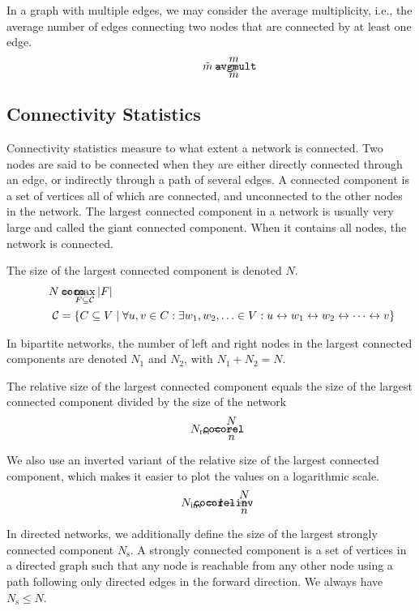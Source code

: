 \documentclass{article}
\def\mathnote#1{%
  \tag*{\rlap{\hspace\marginparsep\smash{\parbox[t]{\marginparwidth}{#1}}}}
}
\begin{document}
In a graph with multiple edges, we may consider the average
multiplicity, i.e., the average number of edges connecting two nodes
that are connected by at least one edge. 
\begin{align}
  \mathnote{\texttt{avgmult}}
  \tilde{m} = \frac m {\bar{\bar m}} 
\end{align}

\subsection{Connectivity Statistics}
Connectivity statistics measure to what extent a network is
connected. 
Two nodes are said to be connected when they are either directly
connected through an edge, or indirectly through a path of several
edges. 
A connected component is a set of vertices all of which are connected,
and unconnected to the other nodes in the network.  
The largest connected component in a network is usually very large and
called the giant connected component. When it contains all nodes, the
network is connected. 

The size of the largest connected component is denoted 
$N$.  
\begin{align}
  \mathnote{\texttt{coco}}
  N &= \max_{F \subseteq \mathcal C} |F|  \\
  \mathcal C &= \{ C \subseteq V \mid \forall u, v \in C:  \exists w_1,
  w_2, \ldots \in V:  u \leftrightarrow w_1 \leftrightarrow w_2 \leftrightarrow \cdots \leftrightarrow v \} \nonumber
\end{align}

In bipartite networks, the number of left and right nodes in the largest
connected components are denoted $N_1$ and $N_2$,
with $N_1 + N_2 = N$. 

The relative size of the largest connected component equals the
size of the largest connected component divided by the size of the
network
\begin{align}
  \mathnote{\texttt{cocorel}}
  N_{\mathrm{rel}} &= \frac N n. 
\end{align}

We also use an inverted variant of the relative size of the largest
connected component, which makes it easier to plot the values on a
logarithmic scale.
\begin{align}
  \mathnote{\texttt{cocorelinv}}
  N_{\mathrm{inv}} &= 1 - \frac N n 
\end{align}

In directed networks, we additionally define the size of the largest
strongly connected component $N_{\mathrm s}$.  A strongly
connected component is a 
set of vertices in a directed graph such that any node is reachable from
any other node using a path following only directed edges in the forward
direction.   We always have $N_{\mathrm s} \leq N$. 
\end{document}
